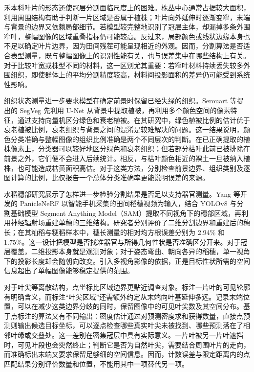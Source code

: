禾本科叶片的形态还使冠层分割面临尺度上的困难。株丛中心通常占据较大面积，利用周围结构有助于判断一片区域是否属于植株；叶片向外延伸时逐渐变窄，末端与背景的边界又依赖局部细节。若模型较完整地识别了冠层主体，却漏掉多条外围窄叶，整幅图像的区域重叠指标仍可能较高。反过来，局部颜色或线状边缘本身也不足以确定叶片边界，因为田间残茬可能呈现相近的外观。因而，分割算法是否适合表型测量，既与整幅图像上的识别性能有关，也与误差集中在哪些结构上有关。对于比较叶宽或株型不同的材料，这一区别尤其重要：若窄叶材料持续丢失较多外围组织，即使群体上的平均分割精度较高，材料间投影面积的差异仍可能受到系统性影响。

组织状态测量进一步要求模型在确定前景时保留已经失绿的组织。Serouart 等提出的 SegVeg 先利用 U-Net 从背景中提取植被，再利用多个颜色空间的像素特征，通过支持向量机区分绿色和衰老植被。在其研究中，绿色植被比例的估计优于衰老植被比例，衰老组织与背景之间的混淆是较难解决的问题。这一结果说明，颜色分类准确与整幅图像的组织比例准确是两个不同层次的判断。在已正确提取的植株像素上，分类器可以较好地区分绿色和衰老组织；但若部分枯叶此前已被排除在前景之外，它们便不会进入后续统计。相反，与枯叶颜色相近的裸土一旦被纳入植株，也可能造成枯黄面积高估。对于这类方法，分别检查前景边界、组织类别及逐图计算的比例，比仅报告一个总体分类准确率更能说明误差的来源。

水稻穗部研究展示了怎样进一步检验分割结果是否足以支持器官测量。Yang 等开发的 PanicleNeRF 以智能手机采集的田间稻穗视频为输入，结合 YOLOv8 与分割基础模型 Segment Anything Model（SAM）提取不同视角下的穗部区域，再利用神经辐射场重建单穗的三维结构。研究者分别评价了二维分割边界和重建后的穗长；在其籼稻与粳稻样本中，穗长测量的相对均方根误差分别为 2.94\% 和 1.75\%。这一设计把模型是否找准器官与所得几何性状是否准确区分开来。对于冠层覆盖，二维投影本身就是观测对象；对于姿态弯曲、朝向各异的稻穗，单一视角下的投影长度却会随朝向改变。引入多视角影像的依据，正是目标性状所需的空间信息超出了单幅图像能够稳定提供的范围。

对于叶尖等离散结构，点坐标比区域边界更贴近调查对象。标注一片叶的可见轮廓有明确含义，而标注“叶尖区域”还需额外约定从末端向叶基延伸多远。记录末端位置，可以在减少这类边界分歧的同时，保留图像中的可见叶尖数及其空间分布。基于点标注的算法又有不同输出：密度估计通过对预测密度求和获得数量，直接点预测则输出候选目标坐标，可以逐点检查哪些真实叶尖未被找到、哪些预测落在了相邻叶缘或交叠处。这一差别在密集冠层中具有实际意义。一片叶被另一片叶遮挡时，可见叶段也会突然终止；判断它是否为自然叶尖，需要结合周围叶片的走向，而准确标出末端又要求保留足够细的空间信息。因而，计数误差与限定距离内的点匹配结果分别评价数量和位置，不能用其中一项替代另一项。

